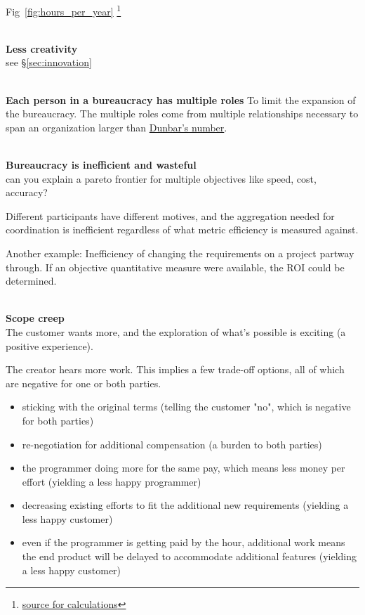 Fig~\ref{fig:hours_per_year}
\footnote{\href{https://docs.google.com/spreadsheets/d/1ZaOZZXWkEzX4fFltUdlR4A6ENrAXnkzTW4YrjA4tDO8/edit?usp=sharing}{source for calculations}}

\ \\

\textbf{Less creativity}\\
see \S\ref{sec:innovation}

\ \\

\textbf{Each person in a bureaucracy has multiple roles} To limit the expansion of the bureaucracy. The multiple roles come from multiple relationships necessary to span an organization larger than \href{https://en.wikipedia.org/wiki/Dunbar\%27s_number}{Dunbar's number}. 

\ \\

\textbf{Bureaucracy is inefficient and wasteful}\\
can you explain a pareto frontier for multiple objectives like speed, cost, accuracy?

Different participants have different motives, and the aggregation needed for coordination is inefficient regardless of what metric efficiency is measured against.

Another example: Inefficiency of changing the requirements on a project partway through. If an objective quantitative measure were available, the ROI could be determined. 

\ \\

\textbf{Scope creep} \\
The customer wants more, and the exploration of what's possible is exciting (a positive experience).

The creator hears more work. This implies a few trade-off options, all of which are negative for one or both parties.
\begin{itemize}
    \item sticking with the original terms (telling the customer "no", which is negative for both parties)
    \item re-negotiation for additional compensation (a burden to both parties)
    \item the programmer doing more for the same pay, which means less money per effort (yielding a less happy programmer)
    \item decreasing existing efforts to fit the additional new requirements (yielding a less happy customer)
    \item even if the programmer is getting paid by the hour, additional work means the end product will be delayed to accommodate additional features (yielding a less happy customer)
\end{itemize}

